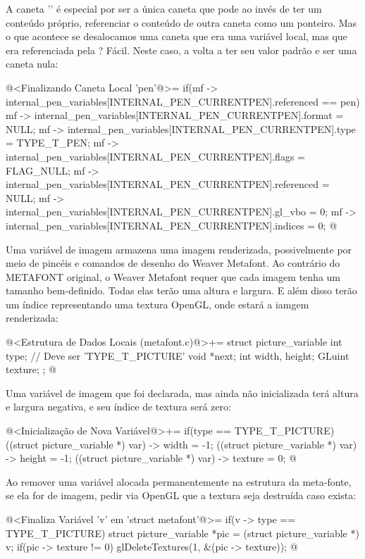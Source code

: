 A caneta '' é especial por ser a única caneta
que pode ao invés de ter um conteúdo próprio, referenciar o conteúdo
de outra caneta como um ponteiro. Mas o que acontece se desalocamos
uma caneta que era uma variável local, mas que era referenciada
pela ? Fácil. Neste caso,
a  volta a ter seu valor padrão e ser uma
caneta nula:

\iniciocodigo
@<Finalizando Caneta Local 'pen'@>=
if(mf -> internal_pen_variables[INTERNAL_PEN_CURRENTPEN].referenced == pen){
  mf -> internal_pen_variables[INTERNAL_PEN_CURRENTPEN].format = NULL;
  mf -> internal_pen_variables[INTERNAL_PEN_CURRENTPEN].type = TYPE_T_PEN;
  mf -> internal_pen_variables[INTERNAL_PEN_CURRENTPEN].flags = FLAG_NULL;
  mf -> internal_pen_variables[INTERNAL_PEN_CURRENTPEN].referenced = NULL;
  mf -> internal_pen_variables[INTERNAL_PEN_CURRENTPEN].gl_vbo = 0;
  mf -> internal_pen_variables[INTERNAL_PEN_CURRENTPEN].indices = 0;
}
@
\fimcodigo


Uma variável de imagem armazena uma imagem renderizada, possivelmente
por meio de pincéis e comandos de desenho do Weaver Metafont. Ao
contrário do METAFONT original, o Weaver Metafont requer que cada
imagem tenha um tamanho bem-definido. Todas elas terão uma altura e
largura. E além disso terão um índice representando uma textura
OpenGL, onde estará a iamgem renderizada:

\iniciocodigo
@<Estrutura de Dados Locais (metafont.c)@>+=
struct picture_variable{
  int type; // Deve ser 'TYPE_T_PICTURE'
  void *next;
  int width, height;
  GLuint texture;
};
@
\fimcodigo

Uma variável de imagem que foi declarada, mas ainda não inicializada
terá altura e largura negativa, e seu índice de textura será zero:

\iniciocodigo
@<Inicialização de Nova Variável@>+=
if(type == TYPE_T_PICTURE){
  ((struct picture_variable *) var) -> width = -1;
  ((struct picture_variable *) var) -> height = -1;
  ((struct picture_variable *) var) -> texture = 0;
}
@
\fimcodigo

Ao remover uma variável alocada permanentemente na estrutura da
meta-fonte, se ela for de imagem, pedir via OpenGL que a textura seja
destruída caso exista:

\iniciocodigo
@<Finaliza Variável 'v' em 'struct metafont'@>=
if(v -> type == TYPE_T_PICTURE){
  struct picture_variable *pic = (struct picture_variable *) v;
  if(pic -> texture != 0)
    glDeleteTextures(1, &(pic -> texture));
}
@
\fimcodigo

